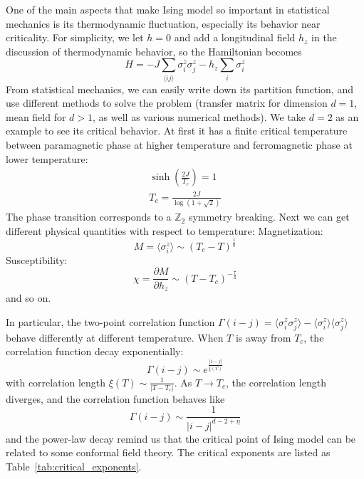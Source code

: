 \documentclass{article}
\theoremstyle{plain} \newtheorem{thm}{Theorem}[section]
\theoremstyle{definition} \newtheorem{df}{Definition}[section]
\theoremstyle{definition} \newtheorem{eg}{Example}
\theoremstyle{remark} \newtheorem*{rmk}{Remark}
\begin{document}
One of the main aspects that make Ising model so important in statistical mechanics is its thermodynamic fluctuation, especially its behavior near criticality. For simplicity, we let $h=0$ and add a longitudinal field $h_z$ in the discussion of thermodynamic behavior, so the Hamiltonian becomes
\begin{equation}
	H=-J\sum_{\langle ij\rangle}\sigma^z_i\sigma^z_j-h_z\sum_i\sigma_i^z
\end{equation}
From statistical mechanics, we can easily write down its partition function, and use different methods to solve the problem (transfer matrix for dimension $d=1$, mean field for $d>1$, as well as various numerical methods). We take $d=2$ as an example to see its critical behavior. At first it has a finite critical temperature between paramagnetic phase at higher temperature and ferromagnetic phase at lower temperature:
\begin{gather}
	\sinh\left(\frac{2J}{T_c}\right)=1\\
	T_c=\frac{2J}{\log(1+\sqrt{2})}
\end{gather} 
The phase transition corresponds to a $\mathbb{Z}_2$ symmetry breaking. Next we can get different physical quantities with respect to temperature:
Magnetization:
\begin{equation}
	M=\langle\sigma_i^z\rangle\sim(T_c-T)^{\frac{1}{8}}
\end{equation}
Susceptibility:
\begin{equation}
	\chi=\frac{\partial M}{\partial h_z}\sim(T-T_c)^{-\frac{7}{4}}
\end{equation}
and so on. 

In particular, the two-point correlation function $\Gamma(i-j)=\langle\sigma_i^z\sigma_j^z\rangle-\langle\sigma_i^z\rangle\langle\sigma_j^z\rangle$ behave differently at different temperature. When $T$ is away from $T_c$, the correlation function decay exponentially:
\begin{equation}
	\Gamma(i-j)\sim e^{\frac{|i-j|}{\xi(T)}}
\end{equation}
with correlation length $\xi(T)\sim\frac{1}{|T-T_c|}$. As $T\rightarrow T_c$, the correlation length diverges, and the correlation function behaves like
\begin{equation}
	\Gamma(i-j)\sim\frac{1}{|i-j|^{d-2+\eta}}
\end{equation}
and the power-law decay remind us that the critical point of Ising model can be related to some conformal field theory. The critical exponents are listed as Table~\ref{tab:critical_exponents}.
\end{document}
